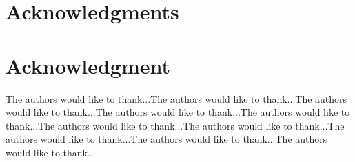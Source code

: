 \documentclass[10pt,journal,compsoc]{IEEEtran}
\begin{document}







\ifCLASSOPTIONcompsoc
  \section*{Acknowledgments}
\else
  \section*{Acknowledgment}
\fi


The authors would like to thank...The authors would like to thank...The authors would like to thank...The authors would like to thank...The authors would like to thank...The authors would like to thank...The authors would like to thank...The authors would like to thank...The authors would like to thank...The authors would like to thank...


\ifCLASSOPTIONcaptionsoff
  \newpage
\fi





%
%
%
\end{document}
